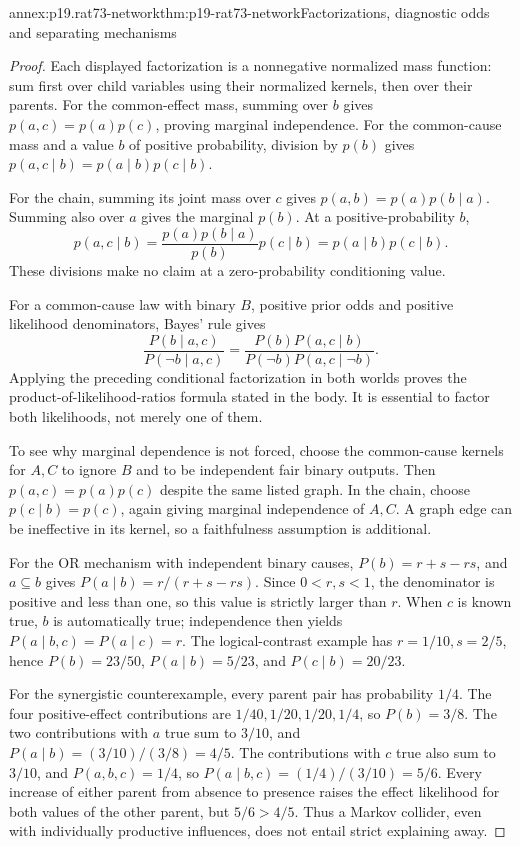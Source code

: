 \begin{annexitem}{annex:p19.rat73-network}{thm:p19-rat73-network}{Factorizations, diagnostic odds and separating mechanisms}
\begin{proof}
Each displayed factorization is a nonnegative normalized mass function:
sum first over child variables using their normalized kernels, then
over their parents. For the common-effect mass, summing over \(b\)
gives \(p(a,c)=p(a)p(c)\), proving marginal independence.
For the common-cause mass and a value \(b\) of positive probability,
division by \(p(b)\) gives
\(p(a,c\mid b)=p(a\mid b)p(c\mid b)\).

For the chain, summing its joint mass over \(c\) gives
\(p(a,b)=p(a)p(b\mid a)\). Summing also over \(a\)
gives the marginal \(p(b)\). At a positive-probability \(b\),
\[
 p(a,c\mid b)=\frac{p(a)p(b\mid a)}{p(b)}p(c\mid b)
             =p(a\mid b)p(c\mid b).
\]
These divisions make no claim at a zero-probability conditioning value.

For a common-cause law with binary \(B\), positive prior odds and
positive likelihood denominators, Bayes' rule gives
\[
 \frac{P(b\mid a,c)}{P(\neg b\mid a,c)}
 =\frac{P(b)P(a,c\mid b)}{P(\neg b)P(a,c\mid\neg b)}.
\]
Applying the preceding conditional factorization in both worlds proves
the product-of-likelihood-ratios formula stated in the body.
It is essential to factor both likelihoods, not merely one of them.

To see why marginal dependence is not forced, choose the common-cause
kernels for \(A,C\) to ignore \(B\) and to be independent fair
binary outputs. Then \(p(a,c)=p(a)p(c)\) despite the same listed
graph. In the chain, choose \(p(c\mid b)=p(c)\), again giving
marginal independence of \(A,C\). A graph edge can be ineffective
in its kernel, so a faithfulness assumption is additional.

For the OR mechanism with independent binary causes,
\(P(b)=r+s-rs\), and \(a\subseteq b\) gives
\(P(a\mid b)=r/(r+s-rs)\).
Since \(0<r,s<1\), the denominator is positive and less than one,
so this value is strictly larger than \(r\).
When \(c\) is known true, \(b\) is automatically true; independence
then yields \(P(a\mid b,c)=P(a\mid c)=r\).
The logical-contrast example has \(r=1/10,s=2/5\), hence
\(P(b)=23/50\), \(P(a\mid b)=5/23\), and
\(P(c\mid b)=20/23\).

For the synergistic counterexample, every parent pair has probability
\(1/4\). The four positive-effect contributions are
\(1/40,1/20,1/20,1/4\), so \(P(b)=3/8\).
The two contributions with \(a\) true sum to \(3/10\),
and \(P(a\mid b)=(3/10)/(3/8)=4/5\).
The contributions with \(c\) true also sum to \(3/10\),
and \(P(a,b,c)=1/4\), so
\(P(a\mid b,c)=(1/4)/(3/10)=5/6\).
Every increase of either parent from absence to presence raises the
effect likelihood for both values of the other parent, but
\(5/6>4/5\). Thus a Markov collider, even with individually
productive influences, does not entail strict explaining away.
\end{proof}
\end{annexitem}
